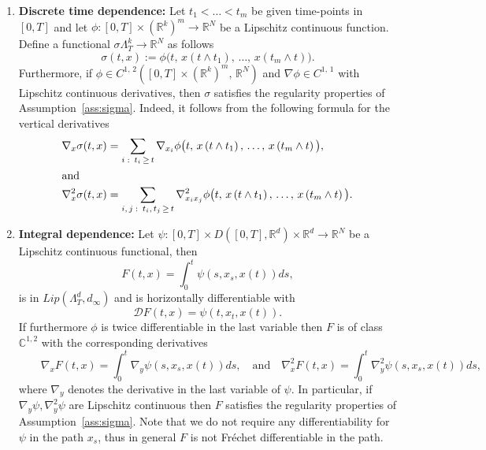 \documentclass[AHL,Unicode,longabstracts,published]{cedram}
\newcommand{\epsi}{\varepsilon}
\newcommand{\bbC}{\mathbb{C}}
\newcommand{\calD}{\mathcal{D}}
\newcommand{\Rr}{{\mathbb{R}}}
\begin{document}
\begin{exam}
\begin{enumerate}
The above functionals can be adapted for multidimensional paths. Let $\varphi\colon\Rr^d\to\Rr_+$ be a Lipschitz continuous functional, consider the following non-anticipative functional:
\[
b(t, x):=m(t,\,\varphi\circ x).
\]
Under the assumptions on $\varphi$ one can easily check that $b$ is boundedness preserving and $b\in Lip(\Lambda^{d}_T, d_{\infty})$. If the function $\varphi\in C^2$ with Lipschitz continuous derivatives then the functional
\[
\sigma(t,x):=M_{\epsi,\,h}\left(t,\,\varphi\circ x\right)
\]
satisfies Assumption~\ref{ass:sigma}.

\item{\bf {Discrete time dependence}:} Let $t_1<\ldots<t_m$ be given time-points in $[0,T]$ and let $\phi\colon[0,T]\times (\Rr^k)^m\to \Rr^N$ be a Lipschitz continuous function. Define a functional $\sigma\Lambda_T^k\to\Rr^N$ as follows
\[
\sigma(t, x):=\phi\big(t,\, x(t\wedge t_1),\,\ldots,\, x(t_m\wedge t)\big).
\]
Furthermore, if $\phi\in C^{1,\,2}([0,T]\times (\Rr^k)^m, \,\Rr^N)$ and $\nabla\phi\in C^{1,\,1}$ with Lipschitz continuous derivatives, then $\sigma$ satisfies the regularity properties of Assumption~\ref{ass:sigma}. Indeed, it follows from the following formula for the vertical derivatives
\begin{align*}
\nabla_{{x}}\sigma(t, x) &=\sum_{i\,\colon\,t_i\,\geq\,t}\nabla_{x_i}\phi\big(t,\, x\left(t\wedge t_1\right),\,\ldots,\, x\left(t_m\wedge t\right)\big),
\\
\intertext{and}
\nabla^2_{x}\sigma(t, x) &=\sum_{i,\,j\,\colon\,t_i,\,t_j\,\geq\,t}\nabla^2_{x_i x_j}\phi\big(t,\, x\left(t\wedge t_1\right),\,\ldots,\, x\left(t_m\wedge t\right)\big).
\end{align*}
\item{\bf {Integral dependence}:} Let $\psi\colon[0,T]\times D([0,T], \Rr^d)\times \Rr^d\to \Rr^N$ be a Lipschitz continuous functional, then
\[
F(t, x)=\int_0^t \psi(s, x_s, x(t)) ds,
\]
is in $ Lip(\Lambda^{d}_T, d_{\infty})$ and is horizontally differentiable with
\[
\calD F(t, x)=\psi(t, x_t, x(t)).
\]
If furthermore $\phi$ is twice differentiable in the last variable then $F$ is of class $\bbC^{1,2}$ with the corresponding derivatives
\[
\qquad \nabla_{{x}}F(t, x)=\int_0^t \nabla_{y}\psi(s, x_s, x(t)) ds,\quad\text{and}\quad\nabla^2_{{x}}F(t, x)=\int_0^t \nabla^2_{y}\psi(s, x_s, x(t)) ds,
\]
where $\nabla_{y}$ denotes the derivative in the last variable of $\psi$. In particular, if $ \nabla_{y}\psi, \nabla^2_{y}\psi$ are Lipschitz continuous then $F$ satisfies the regularity properties of Assumption~\ref{ass:sigma}. Note that we do not require any differentiability for $\psi$ in the path $x_s$, thus in general $F$ is not Fréchet differentiable in the path.
\end{enumerate}
\end{exam}
\end{document}
